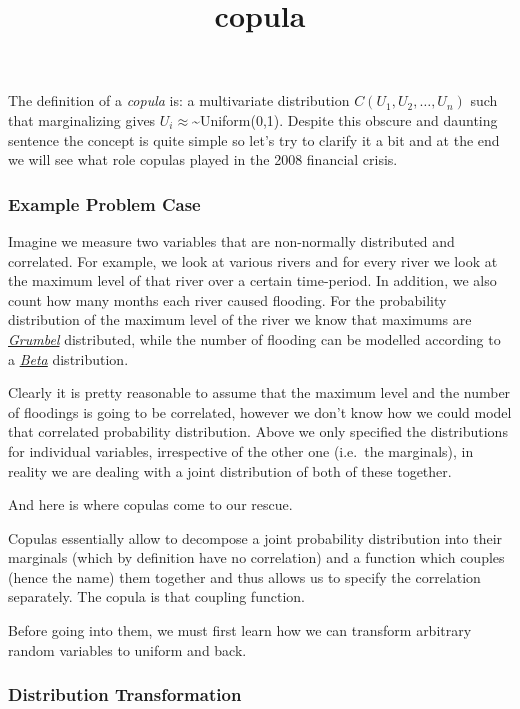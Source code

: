 \documentclass[11pt]{article}
\title{copula}
\begin{document}
    
    \maketitle
    
    

    
    The definition of a \emph{copula} is: a multivariate distribution
\(C(U_1, U_2, \ldots, U_n)\) such that marginalizing gives
\(U_i \approx\)\textasciitilde{}Uniform(0,1). Despite this obscure and
daunting sentence the concept is quite simple so let's try to clarify it
a bit and at the end we will see what role copulas played in the 2008
financial crisis.

\hypertarget{example-problem-case}{%
\subsubsection{Example Problem Case}\label{example-problem-case}}

Imagine we measure two variables that are non-normally distributed and
correlated. For example, we look at various rivers and for every river
we look at the maximum level of that river over a certain time-period.
In addition, we also count how many months each river caused flooding.
For the probability distribution of the maximum level of the river we
know that maximums are \href{}{\emph{Grumbel}} distributed, while the
number of flooding can be modelled according to a \href{}{\emph{Beta}}
distribution.

Clearly it is pretty reasonable to assume that the maximum level and the
number of floodings is going to be correlated, however we don't know how
we could model that correlated probability distribution. Above we only
specified the distributions for individual variables, irrespective of
the other one (i.e.~the marginals), in reality we are dealing with a
joint distribution of both of these together.

And here is where copulas come to our rescue.

Copulas essentially allow to decompose a joint probability distribution
into their marginals (which by definition have no correlation) and a
function which couples (hence the name) them together and thus allows us
to specify the correlation separately. The copula is that coupling
function.

Before going into them, we must first learn how we can transform
arbitrary random variables to uniform and back.

\hypertarget{distribution-transformation}{%
\subsubsection{Distribution
Transformation}\label{distribution-transformation}}
\end{document}
